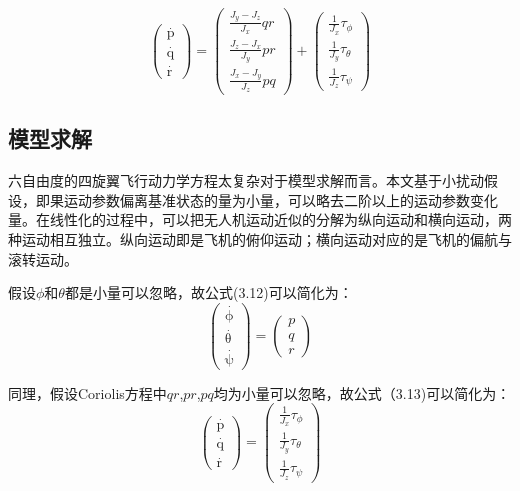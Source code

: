 \begin{equation}
\left( \begin{array}{l}
\mathop p\limits^ \cdot  \\
\mathop q\limits^ \cdot  \\
\mathop r\limits^ \cdot
\end{array} \right) = \left( \begin{array}{l}
\frac{{{J_y} - {J_z}}}{{{J_x}}}qr\\
\frac{{{J_z} - {J_x}}}{{{J_y}}}pr\\
\frac{{{J_x} - {J_y}}}{{{J_z}}}pq
\end{array} \right) + \left( \begin{array}{l}
\frac{1}{{{J_x}}}{\tau _\phi }\\
\frac{1}{{{J_y}}}{\tau _\theta }\\
\frac{1}{{{J_z}}}{\tau _\psi }
\end{array} \right)
\end{equation}

\subsection{模型求解}

六自由度的四旋翼飞行动力学方程太复杂对于模型求解而言。本文基于小扰动假设，即果运动参数偏离基准状态的量为小量，可以略去二阶以上的运动参数变化量。在线性化的过程中，可以把无人机运动近似的分解为纵向运动和横向运动，两种运动相互独立。纵向运动即是飞机的俯仰运动；横向运动对应的是飞机的偏航与滚转运动。

假设$\phi$和$\theta$都是小量可以忽略，故公式(3.12)可以简化为：
\[\left( \begin{array}{l}
\mathop \phi \limits^ \cdot  \\
\mathop \theta \limits^ \cdot  \\
\mathop \psi \limits^ \cdot
\end{array} \right) = \left( \begin{array}{l}
p\\
q\\
r
\end{array} \right)\]

同理，假设Coriolis方程中$qr$,$pr$,$pq$均为小量可以忽略，故公式（3.13)可以简化为：
\[\left( \begin{array}{l}
\mathop p\limits^ \cdot  \\
\mathop q\limits^ \cdot  \\
\mathop r\limits^ \cdot
\end{array} \right) = \left( \begin{array}{l}
\frac{1}{{{J_x}}}{\tau _\phi }\\
\frac{1}{{{J_y}}}{\tau _\theta }\\
\frac{1}{{{J_z}}}{\tau _\psi }
\end{array} \right)\]

